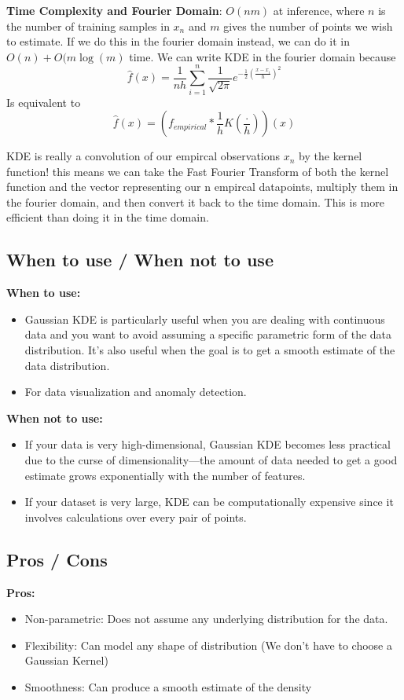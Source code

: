 \documentclass[12pt]{article}
\begin{document}
\textbf{Time Complexity and Fourier Domain}: 
\(O(nm)\) at inference, where \(n\) is the number of training samples in \(x_n\) and \(m\) gives the number of points we wish to estimate. If we do this in the fourier domain instead, we can do it in \(O(n) + O(m\log(m)\) time. We can write KDE in the fourier domain because
\[
\hat{f}(x) = \frac{1}{nh} \sum_{i=1}^{n} \frac{1}{\sqrt{2\pi}} e^{-\frac{1}{2}\left(\frac{x - x_i}{h}\right)^2} 
\]
Is equivalent to 
\[
\hat{f}(x) = \left(f_{empirical} * \frac{1}{h}K\left(\frac{.}{h}\right) \right)(x)
\]

KDE is really a convolution of our empircal observations \(x_n\) by the kernel function! this means we can take the Fast Fourier Transform of both the kernel function and the vector representing our n empircal datapoints, multiply them in the fourier domain, and then convert it back to the time domain. This is more efficient than doing it in the time domain. 
\subsection{When to use / When not to use}
\textbf{When to use:}
\begin{itemize}
    \item Gaussian KDE is particularly useful when you are dealing with continuous data and you want to avoid assuming a specific parametric form of the data distribution. It’s also useful when the goal is to get a smooth estimate of the data distribution.
    \item For data visualization and anomaly detection.
\end{itemize}

\textbf{When not to use:}
\begin{itemize}
    \item If your data is very high-dimensional, Gaussian KDE becomes less practical due to the curse of dimensionality—the amount of data needed to get a good estimate grows exponentially with the number of features.
    \item If your dataset is very large, KDE can be computationally expensive since it involves calculations over every pair of points.
\end{itemize}

\subsection{Pros / Cons}
\textbf{Pros:}
\begin{itemize}
    \item Non-parametric: Does not assume any underlying distribution for the data.
    \item Flexibility: Can model any shape of distribution (We don't have to choose a Gaussian Kernel)
	\item Smoothness: Can produce a smooth estimate of the density
\end{itemize}
\end{document}
